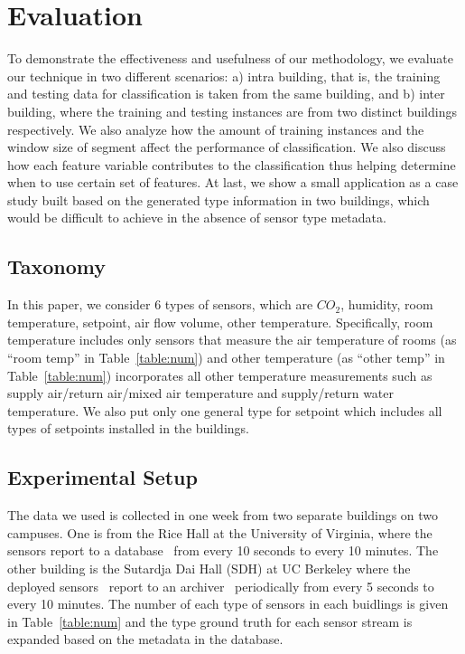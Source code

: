 \section{Evaluation}
To demonstrate the effectiveness and usefulness of our methodology, we evaluate our technique in two different scenarios: a) intra building, that is, the 
training and testing data for classification is taken from the same building, and b) inter building, where the training and testing instances are from two 
distinct buildings respectively. We also analyze how the amount of training instances and the window size of segment affect the performance of classification. We also discuss how each feature variable contributes to the classification thus helping determine when to use certain set of features. At last, we show a small application as a case study built based on the generated type information in two buildings, which would be difficult to achieve in the absence of sensor type metadata.

\subsection{Taxonomy}
In this paper, we consider 6 types of sensors, which are $CO_{2}$, humidity, room temperature, setpoint, air flow volume, other temperature. Specifically, room 
temperature includes only sensors that measure the air temperature of rooms (as ``room temp'' in Table~\ref{table:num}) and other temperature (as ``other temp'' in Table~\ref{table:num}) incorporates all other temperature measurements such as supply 
air/return air/mixed air temperature and supply/return water temperature. We also put only one general type for setpoint which includes all types of setpoints 
installed in the buildings.

\subsection{Experimental Setup}
The data we used is collected in one week from two separate buildings on two campuses. One is from the Rice Hall at 
the University of Virginia, where the sensors report to a database~\cite{trane} from every 10 seconds to every 10 minutes. The other building is the Sutardja Dai Hall (SDH) at UC Berkeley where the deployed 
sensors~\cite{keti, bacnet} report to an archiver~\cite{smap} periodically from every 5 seconds to every 10 minutes. The number of each type of sensors in 
each buidlings is given in Table~\ref{table:num} and the type ground truth for each sensor stream is expanded based on the metadata in the database.

